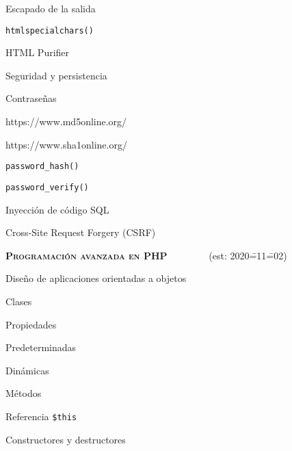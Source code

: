 \begin{longenum}
\begin{longenum}
\begin{longenum}
\begin{longenum}
                \item Escapado de la salida
                \begin{longenum}
                    \item \texttt{htmlspecialchars()}
                    \item HTML Purifier
                \end{longenum}
            \end{longenum}
        \end{longenum}
        \item Seguridad y persistencia
        \begin{longenum}
            \item Contraseñas
            \begin{longenum}
                \item https://www.md5online.org/
                \item https://www.sha1online.org/
                \item \texttt{password\_hash()}
                \item \texttt{password\_verify()}
            \end{longenum}
            \item Inyección de código SQL
            \item Cross-Site Request Forgery (CSRF)
        \end{longenum}
    \end{longenum}
    \item \textbf{\textsc{Programación avanzada en PHP}} \ \ \ \ \ \ \ \ (est: 2020\==11\==02)
    \begin{longenum}
        \item Diseño de aplicaciones orientadas a objetos
        \begin{longenum}
            \item Clases
            \item Propiedades
            \begin{longenum}
                \item Predeterminadas
                \item Dinámicas
            \end{longenum}
            \item Métodos
            \begin{longenum}
                \item Referencia \texttt{\$this}
                \item Constructores y destructores

\end{longenum}
\end{longenum}
\end{longenum}
\end{longenum}
